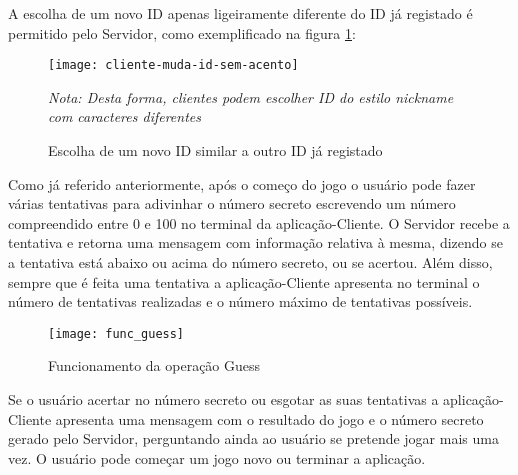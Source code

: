 A escolha de um novo ID apenas ligeiramente diferente do ID já registado é permitido pelo Servidor, como exemplificado na figura \ref{fig:cliente-muda-id-sem-acento}:  

\begin{figure}[H]
	\centering
	\texttt{[image: cliente-muda-id-sem-acento]}
	\caption{Escolha de um novo ID similar a outro ID já registado\\}
	\label{fig:cliente-muda-id-sem-acento}
	\flushleft\small\textit{Nota: Desta forma, clientes podem escolher ID do estilo \textit{nickname} com caracteres diferentes}
\end{figure} 

Como já referido anteriormente, após o começo do jogo o usuário pode fazer várias tentativas para adivinhar o número secreto escrevendo um número compreendido entre 0 e 100 no terminal da aplicação-Cliente. O Servidor recebe a tentativa e retorna uma mensagem com informação relativa à mesma, dizendo se a tentativa está abaixo ou acima do número secreto, ou se acertou. Além disso, sempre que é feita uma tentativa a aplicação-Cliente apresenta no terminal o número de tentativas realizadas e o número máximo de tentativas possíveis.

\begin{figure}[H]
	\centering
	\texttt{[image: func\_guess]}
	\caption{Funcionamento da operação Guess\\}
	\label{fig:func_guess}
\end{figure} 

Se o usuário acertar no número secreto ou esgotar as suas tentativas a aplicação-Cliente apresenta uma mensagem com o resultado do jogo e o número secreto gerado pelo Servidor, perguntando ainda ao usuário se pretende jogar mais uma vez. O usuário pode começar um jogo novo ou terminar a aplicação.


